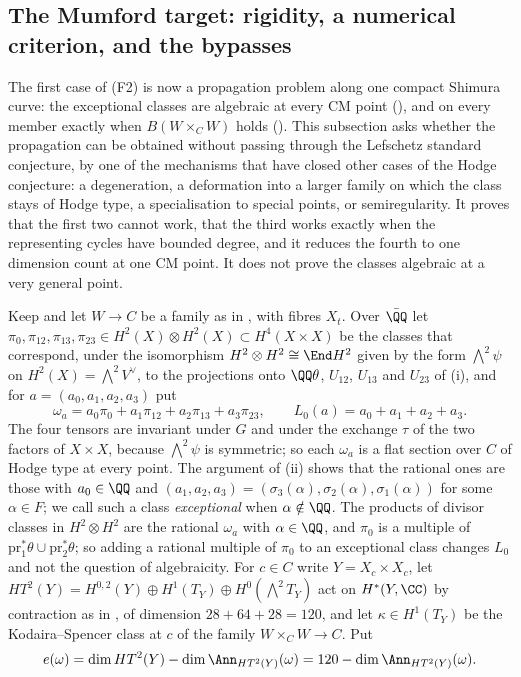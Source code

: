 \subsection{The Mumford target: rigidity, a numerical criterion, and the
bypasses}\label{ssec:mumfordrigid}

The first case of (F2) is now a propagation problem along one compact
Shimura curve: the exceptional classes are algebraic at every CM point
(), and on every member exactly when $B(W\times_{C}W)$
holds (). This subsection asks whether the
propagation can be obtained without passing through the Lefschetz standard
conjecture, by one of the mechanisms that have closed other cases of the
Hodge conjecture: a degeneration, a deformation into a larger family on which
the class stays of Hodge type, a specialisation to special points, or
semiregularity. It proves that the first two cannot work, that the third
works exactly when the representing cycles have bounded degree, and it
reduces the fourth to one dimension count at one CM point. It does not prove
the classes algebraic at a very general point.

\begin{setupenv}\label{setup:omegaa}
Keep  and let $W\to C$ be a family as in
, with fibres $X_{t}$. Over $\bar{\QQ}$ let
$\pi_{0},\pi_{12},\pi_{13},\pi_{23}\in H^{2}(X)\otimes H^{2}(X)\subset
H^{4}(X\times X)$ be the classes that correspond, under the isomorphism
$H^{2}\otimes H^{2}\cong\End H^{2}$ given by the form ${\textstyle\bigwedge^{2}}\psi$
on $H^{2}(X)={\textstyle\bigwedge^{2}}V^{\vee}$, to the projections onto $\QQ\theta$,
$U_{12}$, $U_{13}$ and $U_{23}$ of (i), and for
$a=(a_{0},a_{1},a_{2},a_{3})$ put
\[
  \omega_{a}=a_{0}\pi_{0}+a_{1}\pi_{12}+a_{2}\pi_{13}+a_{3}\pi_{23},
  \qquad L_{0}(a)=a_{0}+a_{1}+a_{2}+a_{3}.
\]
The four tensors are invariant under $G$ and under the exchange $\tau$ of the
two factors of $X\times X$, because ${\textstyle\bigwedge^{2}}\psi$ is symmetric; so each
$\omega_{a}$ is a flat section over $C$ of Hodge type at every point. The
argument of (ii) shows that the rational ones are those
with $a_{0}\in\QQ$ and $(a_{1},a_{2},a_{3})=(\sigma_{3}(\alpha),
\sigma_{2}(\alpha),\sigma_{1}(\alpha))$ for some $\alpha\in F$; we call such a
class \emph{exceptional} when $\alpha\notin\QQ$. The products of divisor
classes in $H^{2}\otimes H^{2}$ are the rational $\omega_{a}$ with
$\alpha\in\QQ$, and $\pi_{0}$ is a multiple of
$\mathrm{pr}_{1}^{*}\theta\cup\mathrm{pr}_{2}^{*}\theta$; so adding a rational
multiple of $\pi_{0}$ to an exceptional class changes $L_{0}$ and not the
question of algebraicity. For $c\in C$ write $Y=X_{c}\times X_{c}$, let
$HT^{2}(Y)=H^{0,2}(Y)\oplus H^{1}(T_{Y})\oplus H^{0}({\textstyle\bigwedge^{2}}T_{Y})$ act on
$H^{*}(Y,\CC)$ by contraction as in , of dimension
$28+64+28=120$, and let $\kappa\in H^{1}(T_{Y})$ be the Kodaira--Spencer class
at $c$ of the family $W\times_{C}W\to C$. Put
\[
  e(\omega)=\dim HT^{2}(Y)-\dim\Ann_{HT^{2}(Y)}(\omega)
  =120-\dim\Ann_{HT^{2}(Y)}(\omega).
\]
\end{setupenv}

